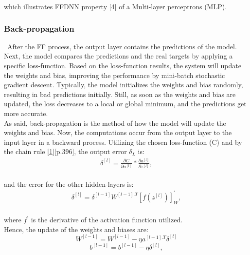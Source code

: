 \noindent which illustrates FFDNN property \hyperref[Bib:Week40Notes]{[4]} of a Multi-layer perceptrons (MLP).\\

\subsubsection{Back-propagation}
\label{chap:Back-propagation}

\qquad \, After the FF process, the output layer contains the predictions of the model. Next, the model compares the predictions and the real targets by applying a specific loss-function. Based on the loss-function results, the system will update the weights and bias, improving the performance by mini-batch stochastic gradient descent. Typically, the model initializes the weights and bias randomly, resulting in bad predictions initially. Still, as soon as the weights and bias are updated, the loss decreases to a local or global minimum, and the predictions get more accurate.\\

As said, back-propagation is the method of how the model will update the weights and bias. Now, the computations occur from the output layer to the input layer in a backward process. Utilizing the chosen loss-function (C) and by the chain rule \hyperref[Bib:The Elements Of Statistical Learning DataMining]{[1]}[p.396], the output error $\delta_L$ is:\\

\begin{align*}
\delta^{[l]} = \frac{\partial C}{\partial a^{[l]}} * \frac{\partial a^{[l]}}{\partial z^{[l]}},
\end{align*}\\

\noindent and the error for the other hidden-layers is:\\

\begin{align*}
\delta^{[l]} = \delta^{[l-1]} W^{[l-1].T} [f(z^{[l]})]_W^',
\end{align*}\\

\noindent where $f^'$ is the derivative of the activation function utilized.\\

Hence, the update of the weights and biases are:\\

$$W^{[l-1]} = W^{[l-1]} - \eta a^{[l-1].T} \delta^{[l]}$$
$$b^{[l-1]} = b^{[l-1]} - \eta \delta^{[l]},$$

